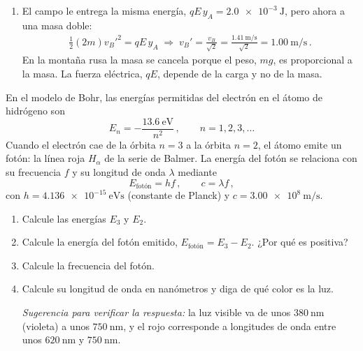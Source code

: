 \documentclass[12pt, a4paper]{article}
\begin{document}
\begin{solution}
\begin{enumerate}
    \item El campo le entrega la misma energía, $qE\,y_A = \qty{2.0e-3}{\joule}$, pero ahora a una masa doble:
    \begin{align}
        \frac{1}{2}(2m)v_B'^2 = qE\,y_A \;\Longrightarrow\; v_B' = \frac{v_B}{\sqrt{2}} = \frac{\qty{1.41}{\meter\per\second}}{\sqrt{2}} = \qty{1.00}{\meter\per\second}\,.
    \end{align}
    En la montaña rusa la masa se cancela porque el peso, $mg$, es proporcional a la masa. La fuerza eléctrica, $qE$, depende de la carga y no de la masa.
\end{enumerate}
\end{solution}

\begin{exercise}[ID=balmer, subtitle={La línea roja del hidrógeno}, tags={parcial3}, points=25, nuevapagina=true]
En el modelo de Bohr, las energías permitidas del electrón en el átomo de hidrógeno son
\begin{equation}
    E_n = -\frac{\qty{13.6}{\electronvolt}}{n^2}\,, \qquad n = 1, 2, 3, \dots
\end{equation}
Cuando el electrón cae de la órbita $n=3$ a la órbita $n=2$, el átomo emite un fotón: la línea roja $H_\alpha$ de la serie de Balmer. La energía del fotón se relaciona con su frecuencia $f$ y su longitud de onda $\lambda$ mediante
\begin{equation}
    E_{\text{fotón}} = h f\,, \qquad c = \lambda f\,,
\end{equation}
con $h = \qty{4.136e-15}{\electronvolt\second}$ (constante de Planck) y $c = \qty{3.00e8}{\meter\per\second}$.

\begin{enumerate}
    \item Calcule las energías $E_3$ y $E_2$.
    \item Calcule la energía del fotón emitido, $E_{\text{fotón}} = E_3 - E_2$. ¿Por qué es positiva?
    \item Calcule la frecuencia del fotón.
    \item Calcule su longitud de onda en nanómetros y diga de qué color es la luz.

\textit{Sugerencia para verificar la respuesta:} la luz visible va de unos $\qty{380}{\nano\meter}$ (violeta) a unos $\qty{750}{\nano\meter}$, y el rojo corresponde a longitudes de onda entre unos $\qty{620}{\nano\meter}$ y $\qty{750}{\nano\meter}$.
\end{enumerate}
\end{exercise}
\end{document}
